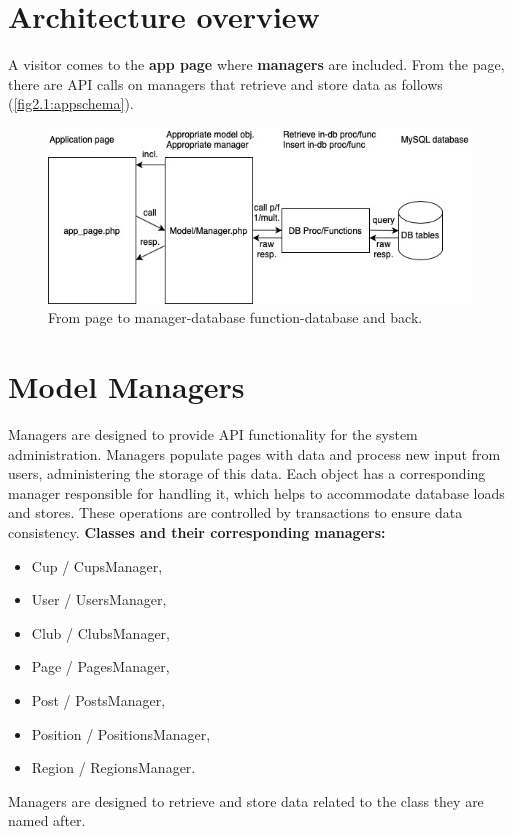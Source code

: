 \section{Architecture overview}
A visitor comes to the \textbf{app page} where \textbf{managers} are included. From the page, there are API calls on managers that retrieve and store data as follows (\autoref{fig2.1:appschema}).
\newline
\begin{figure}[h]	
	\centering	
    \includegraphics[scale=0.707]{img/app-schema.jpg}
	\caption{From page to manager-database function-database and back.}
	\label{fig2.1:appschema}
\end{figure}
\section{Model Managers}
Managers are designed to provide API functionality for the system administration. Managers populate pages with data and process new input from users, administering the storage of this data. Each object has a corresponding manager responsible for handling it, which helps to accommodate database loads and stores. These operations are controlled by transactions to ensure data consistency.
\newline
\textbf{Classes and their corresponding managers:}
\begin{itemize}
    \item Cup / CupsManager,
    \item User / UsersManager,
    \item Club / ClubsManager,
    \item Page / PagesManager,
    \item Post / PostsManager,
    \item Position / PositionsManager,
    \item Region / RegionsManager.
\end{itemize}
Managers are designed to retrieve and store data related to the class they are named after.
\newpage
